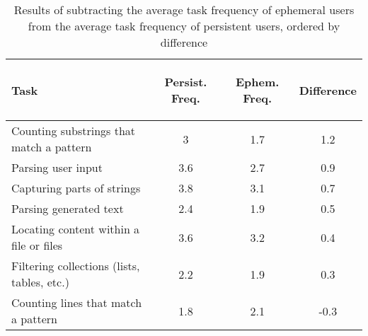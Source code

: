 \begin{table}
\caption{Results of subtracting the average task frequency of ephemeral users from the average task frequency of persistent users, ordered by difference \label{table:regexPersistingTasks}}
\begin{center}
\begin{footnotesize}
\begin{tabular}{lccc}
\toprule
\textbf{Task} & \begin{footnotesize}\textbf{Persist. Freq.}\end{footnotesize} & \begin{footnotesize}\textbf{Ephem. Freq.}\end{footnotesize} & \textbf{Difference} \\  \midrule \bigstrut
Counting  substrings that match a pattern & 3 & 1.7 & 1.2\\  \midrule \bigstrut
Parsing user input & 3.6 & 2.7 & 0.9\\ \midrule \bigstrut
Capturing parts of strings & 3.8 & 3.1 & 0.7\\ \midrule \bigstrut
Parsing generated text & 2.4 & 1.9 & 0.5\\  \midrule \bigstrut
Locating content within a file or files & 3.6 & 3.2 & 0.4\\ \midrule \bigstrut
Filtering collections (lists, tables, etc.) & 2.2 & 1.9 & 0.3\\ \midrule \bigstrut
Counting lines that match a pattern & 1.8 & 2.1 & -0.3\\
\bottomrule
\end{tabular}
\end{footnotesize}
\end{center}
\vspace{-12pt}
\end{table}
